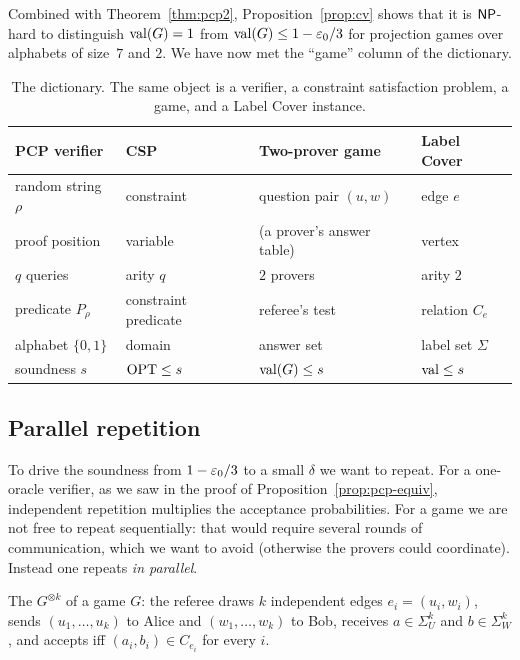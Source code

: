\noindent
Combined with Theorem~\ref{thm:pcp2}, Proposition~\ref{prop:cv} shows that it is $\mathsf{NP}$-hard to
distinguish $\operatorname{val}(G)=1$ from $\operatorname{val}(G)\le1-\varepsilon_0/3$ for projection games over alphabets of
size~$7$ and $2$.  We have now met the ``game'' column of the dictionary.

\begin{table}[t]
\centering\small
\renewcommand{\arraystretch}{1.3}
\begin{tabular}{@{}llll@{}}
\toprule
PCP verifier & CSP & Two-prover game & Label Cover\\
\midrule
random string $\rho$ & constraint & question pair $(u,w)$ & edge $e$\\
proof position & variable & (a prover's answer table) & vertex\\
$q$ queries & arity $q$ & $2$ provers & arity $2$\\
predicate $P_\rho$ & constraint predicate & referee's test & relation $C_e$\\
alphabet $\{0,1\}$ & domain & answer set & label set $\Sigma$\\
soundness $s$ & $\operatorname{OPT}\le s$ & $\operatorname{val}(G)\le s$ & $\operatorname{val}\le s$\\
\bottomrule
\end{tabular}
\caption{The dictionary.  The same object is a verifier, a constraint satisfaction problem, a game, and a
Label Cover instance.}
\label{tab:dict}
\end{table}

\subsection{Parallel repetition}

To drive the soundness from $1-\varepsilon_0/3$ to a small $\delta$ we want to repeat.
For a one-oracle verifier, as we saw in the proof of Proposition~\ref{prop:pcp-equiv}, independent
repetition multiplies the acceptance probabilities.  For a game we are not free to repeat
sequentially: that would require several rounds of communication, which we want to avoid
(otherwise the provers could coordinate).  Instead one repeats \emph{in parallel}.

\begin{definition}
The  $G^{\otimes k}$ of a game $G$: the referee draws $k$ independent
edges $e_i=(u_i,w_i)$, sends $(u_1,\dots,u_k)$ to Alice and $(w_1,\dots,w_k)$ to Bob, receives
$a\in\Sigma_U^k$ and $b\in\Sigma_W^k$, and accepts iff $(a_i,b_i)\in C_{e_i}$ for every $i$.
\end{definition}

